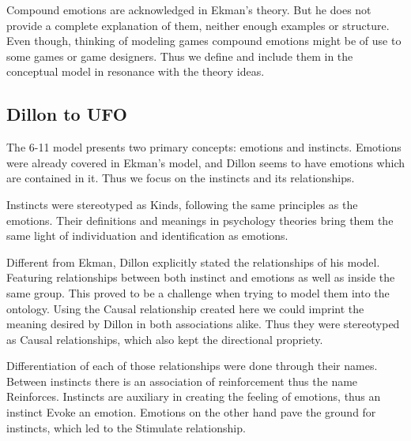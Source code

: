 Compound emotions are acknowledged in Ekman's theory. But he does not provide a complete explanation of them, neither enough examples or structure. Even though, thinking of modeling games compound emotions might be of use to some games or game designers. Thus we define and include them in the conceptual model in resonance with the theory ideas.

\subsection{Dillon to UFO}
The 6-11 model presents two primary concepts: emotions and instincts. Emotions were already covered in Ekman's model, and Dillon seems to have emotions which are contained in it. Thus we focus on the instincts and its relationships.

Instincts were stereotyped as Kinds, following the same principles as the emotions. Their definitions and meanings in psychology theories bring them the same light of individuation and identification as emotions.

Different from Ekman, Dillon explicitly stated the relationships of his model. Featuring relationships between both instinct and emotions as well as inside the same group. This proved to be a challenge when trying to model them into the ontology. Using the Causal relationship created here we could imprint the meaning desired by Dillon in both associations alike. Thus they were stereotyped as Causal relationships, which also kept the directional propriety.

Differentiation of each of those relationships were done through their names. Between instincts there is an association of reinforcement thus the name Reinforces. Instincts are auxiliary in creating the feeling of emotions, thus an instinct Evoke an emotion. Emotions on the other hand pave the ground for instincts, which led to the Stimulate relationship.